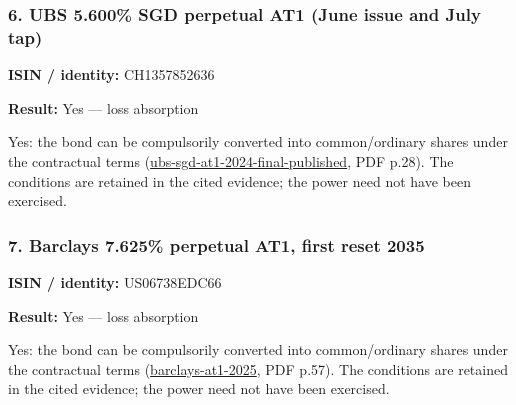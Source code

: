 \documentclass[
  11pt,
]{article}
\begin{document}
\begin{minipage}{\linewidth}

\hypertarget{ubs-5.600-sgd-perpetual-at1-june-issue-and-july-tap}{%
\subsubsection{6. UBS 5.600\% SGD perpetual AT1 (June issue and July
tap)}\label{ubs-5.600-sgd-perpetual-at1-june-issue-and-july-tap}}

\textbf{ISIN / identity:} CH1357852636

\textbf{Result:} Yes --- loss absorption

Yes: the bond can be compulsorily converted into common/ordinary shares
under the contractual terms
(\href{https://www.ubs.com/global/en/investor-relations/investors/bondholder-information/capital-instruments/capital-instruments-content/_jcr_content/root/contentarea/mainpar/toplevelgrid/col_1/table_385933273_copy_478278205.402951188.file/dGFibGVUZXh0PS9jb250ZW50L2RhbS9hc3NldHMvY2MvaW52ZXN0b3ItcmVsYXRpb25zL2JvbmRob2xkZXIvY2FwaXRhbC1pbnN0cnVtZW50cy90Yy1jaDEzNTc4NTI2MzYucGRm/tc-ch1357852636.pdf}{ubs-sgd-at1-2024-final-published},
PDF p.28). The conditions are retained in the cited evidence; the power
need not have been exercised.

\end{minipage}
\par\addvspace{1.1em}

\begin{minipage}{\linewidth}

\hypertarget{barclays-7.625-perpetual-at1-first-reset-2035}{%
\subsubsection{7. Barclays 7.625\% perpetual AT1, first reset
2035}\label{barclays-7.625-perpetual-at1-first-reset-2035}}

\textbf{ISIN / identity:} US06738EDC66

\textbf{Result:} Yes --- loss absorption

Yes: the bond can be compulsorily converted into common/ordinary shares
under the contractual terms
(\href{https://home.barclays/content/dam/home-barclays/documents/investor-relations/fixedincome/2025/20250225-USD-AT1.pdf}{barclays-at1-2025},
PDF p.57). The conditions are retained in the cited evidence; the power
need not have been exercised.

\end{minipage}
\par\addvspace{1.1em}
\end{document}
